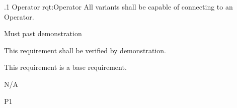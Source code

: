 \ONERQMTVKPP
{\RqtNumberBase.1}
{Operator}
{rqt:Operator}
{All \ThisSys variants shall be capable of connecting to an Operator.}
{
	\item [Phase 1] Must past demonstration
}
{This requirement shall be verified by demonstration.}
{
	\item [N/A] This requirement is a base requirement.
}
{
  \item N/A
}
{P1}


